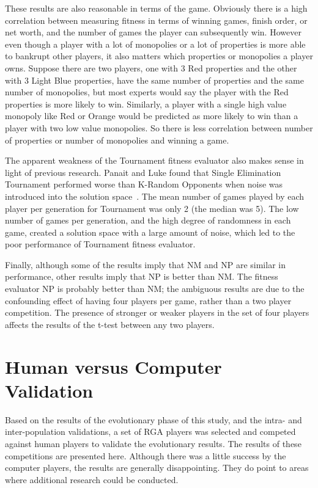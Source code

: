These results are also reasonable in terms of the game. Obviously there is a
high correlation between measuring fitness in terms of winning games, finish
order, or net worth, and the number of games the player can subsequently win.
However even though a player with a lot of monopolies or a lot of properties is
more able to bankrupt other players, it also matters which properties or
monopolies a player owns. Suppose there are two players, one with 3 Red
properties and the other with 3 Light Blue properties, have the same number of
properties and the same number of monopolies, but most experts would say the
player with the Red properties is more likely to win. Similarly, a player with a
single high value monopoly like Red or Orange would be predicted as more likely
to win than a player with two low value monopolies. So there is less correlation
between number of properties or number of monopolies and winning a game.

The apparent weakness of the Tournament fitness evaluator also makes sense in
light of previous research. Panait and Luke found that Single Elimination
Tournament performed worse than K-Random Opponents when noise was introduced
into the solution space~\cite{Panait02acomparative}. The mean number of games
played by each player per generation for Tournament was only 2 (the median was
5). The low number of games per generation, and the high degree of randomness in
each game, created a solution space with a large amount of noise, which led to
the poor performance of Tournament fitness evaluator.

Finally, although some of the results imply that NM and NP are similar in
performance, other results imply that NP is better than NM. The fitness
evaluator NP is probably better than NM; the ambiguous results are due to the
confounding effect of having four players per game, rather than a two player
competition. The presence of stronger or weaker players in the set of four
players affects the results of the t-test between any two players.

\section{Human versus Computer Validation}\label{6_humanValidation}

Based on the results of the evolutionary phase of this study, and the intra- and
inter-population validations, a set of RGA players was selected and competed
against human players to validate the evolutionary results. The results of these
competitions are presented here. Although there was a little success by the
computer players, the results are generally disappointing. They do point to
areas where additional research could be conducted.


